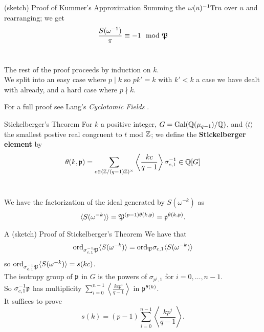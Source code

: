 \documentclass[presentation]{beamer}
\begin{document}
\begin{frame}{(sketch) Proof of Kummer's Approximation}
Summing the $\omega(u)^{-1} \textrm{Tr} u$ over $u$ and rearranging; we get \[ \frac{S(\omega^{-1})}{\pi} \equiv -1 \mod {\mathfrak{P}}\]\\
\pause
\vspace{0.5cm}

The rest of the proof proceeds by induction on $k$. 
\\
\pause
\vspace{0.5cm}
We split into an easy case where $p \mid k$ so $pk' = k$ with $k' < k$ a case we have dealt with already, and a hard case where $p \nmid k$.

For a full proof see Lang's \textit{Cyclotomic Fields} \cite{Lang1990}.

\end{frame}

\begin{frame}{Stickelberger's Theorem}
For  $k$ a positive integer, $G = \textrm{Gal}(\mathbb{Q}(\mu_{q-1})/\mathbb{Q})$, and $\langle t \rangle$ the smallest postive real congruent to $t$ mod $\mathbb{Z}$; we define the \textbf{Stickelberger element} by \[\theta(k,\mathfrak{p}) = \sum_{c \in (\mathbb{Z}/(q-1)\mathbb{Z})^\times} \left \langle \frac{kc}{q-1}\right \rangle \sigma_{c,1}^{-1} \in \mathbb{Q}[G]\]
\\
\pause
\vspace{0.5cm}
\begin{theorem}
We have the factorization of the ideal generated by $S(\omega^{-k})$ as \[\langle S(\omega^{-k})\rangle = \mathfrak{P}^{(p-1)\theta(k, \mathfrak{p})} = \mathfrak{p}^{\theta(k,\mathfrak{p})}.\]
\end{theorem}
\end{frame}

\begin{frame}{A (sketch) Proof of Stickelberger's Theorem}
We have that \[\textrm{ord}_{\sigma_{c,1}^{-1} \mathfrak{P}} \langle S(\omega^{-k})\rangle = \textrm{ord}_{ \mathfrak{P}} \sigma_{c,1}\langle S(\omega^{-k})\rangle \] so $\textrm{ord}_{\sigma_{c,1}^{-1} \mathfrak{P}} \langle S(\omega^{-k})\rangle = s(kc)$.\\

\pause The isotropy group of $\mathfrak{p}$ in $G$ is the powers of $\sigma_{p^i,1}$ for $i = 0, \ldots, n-1$. 
\\
\pause
\vspace{0.5cm}
So $\sigma_{c,1}^{-1} \mathfrak{p}$ has multiplicity $\sum_{i=0}^{n-1} \left\langle \frac{kcp^i}{q-1} \right\rangle$ in $\mathfrak{p}^{\theta(k)}$.
\\
\pause
\vspace{0.5cm}
It suffices to prove \[s(k) = (p-1)\sum_{i=0}^{n-1} \left \langle \frac{k p^i}{q-1} \right \rangle.\]
\end{frame}
\end{document}
